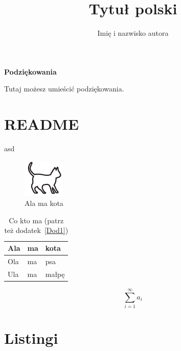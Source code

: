 \documentclass[magister,archiwum,polski]{pwrdyplom}
\author{Imię i nazwisko autora}
\title{Tytuł  polski}
\begin{document}
\maketitle

\newenvironment{acknowledgements}
    {\thispagestyle{empty}\cleardoublepage\null\vfill\begin{center}
    \bfseries Podziękowania\end{center}}
    {\vfill\null}
\begin{acknowledgements}
        Tutaj możesz umieścić podziękowania.
\end{acknowledgements}
        \cleardoublepage
        
%
\tableofcontents
\listoffigures
\listoftables


\chapter{README}

asd
\begin{figure}
\includegraphics[width=.4\textwidth]{kotek}
\caption{Ala ma kota}
\end{figure}


\begin{table}
\caption{Co kto ma \cite{harel_rzecz_2008} (patrz też dodatek~\ref{Dod1})}
\begin{tabular}{|l|l|l|}
\hline
Ala & ma & kota \\
\hline
Ola & ma & psa \\
\hline
Ula & ma & małpę\\
\hline
\end{tabular}
\end{table}

\lipsum[16-20]

\begin{equation}
\sum_{i=1}^{\infty}a_i
\end{equation}

\chapter{Listingi}
\end{document}
